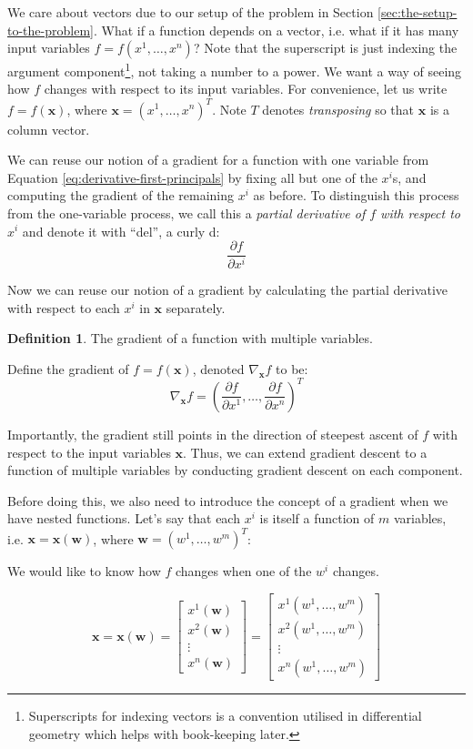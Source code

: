 \documentclass[a4paper]{article}
\theoremstyle{plain} %
\theoremstyle{definition} %
\newtheorem{definition}[theorem]{Definition}
\numberwithin{equation}{subsection}
\newcommand{\del}[2]{\frac{\partial #1}{\partial #2}}
\newcommand{\vx}{{\textbf{x}}}
\begin{document}
We care about vectors due to our setup of the problem in Section \ref{sec:the-setup-to-the-problem}. What if a function depends on a vector, i.e. what if it has many input variables $f = f(x^1, \dots, x^n)$? 
Note that the superscript is just indexing the argument component\footnote{Superscripts for indexing vectors is a convention utilised in differential geometry which helps with book-keeping later.}, 
not taking a number to a power.
We want a way of seeing how $f$ changes with respect to its input variables. For convenience, let us write $f = f(\vx)$, where $\vx = (x^1, \dots, x^n)^T$.
Note $T$ denotes \emph{transposing} so that $\vx$ is a column vector.

We can reuse our notion of a gradient for a function with one variable from Equation \ref{eq:derivative-first-principals} by fixing all but one of the $x^i$s,
and computing the gradient of the remaining $x^i$ as before. To distinguish this process from the one-variable process, we call this a \emph{partial derivative of $f$ with respect to $x^i$} and denote it with ``del'', a curly d:
\[ \del{f}{x^i} \]

Now we can reuse our notion of a gradient by calculating the partial derivative with respect to each $x^i$ in $\vx$ separately.
\begin{definition} \label{def:grad-f}
  The gradient of a function with multiple variables.

  Define the gradient of $f = f(\vx)$, denoted $\nabla_\vx f$ to be:
  \[
  \nabla_\vx f = \left( \del{f}{x^1}, \dots, \del{f}{x^n}  \right)^T
  \] 
\end{definition}

Importantly, the gradient still points in the direction of steepest ascent of $f$ with respect to the input variables $\vx$.
Thus, we can extend gradient descent to a function of multiple variables by conducting gradient descent on each component.

Before doing this, we also need to introduce the concept of a gradient when we have nested functions. Let's say that each $x^i$ is itself a function of $m$ variables, 
i.e. $\vx = \vx(\textbf{w})$, where $\textbf{w} = (w^1, \dots, w^m)^T$:

We would like to know how $f$ changes when one of the $w^i$ changes.

\[
\vx = \vx(\textbf{w}) = \begin{bmatrix}
  x^1(\textbf{w}) \\
  x^2(\textbf{w}) \\
  \vdots \\
  x^n(\textbf{w})
\end{bmatrix} = \begin{bmatrix}
  x^1(w^1, \dots, w^m) \\
  x^2(w^1, \dots, w^m) \\
  \vdots \\
  x^n(w^1, \dots, w^m)
\end{bmatrix}
\]
\end{document}
